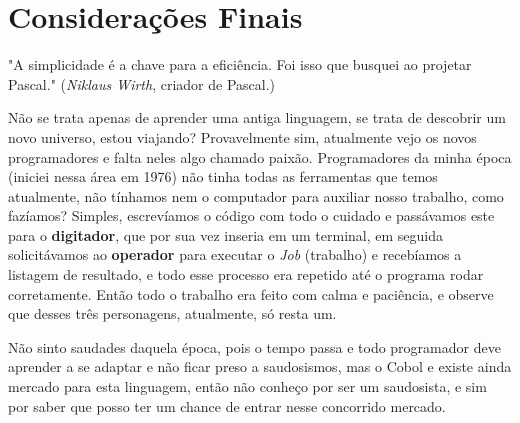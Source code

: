 \documentclass[a4paper,11pt]{book} %
\begin{document}
\pagestyle{empty} %
\tableofcontents %
\cleardoublepage %
\pagestyle{fancy} %
\clearpage %





%
%

\appendix
{}
\chapter{Considerações Finais}
\begin{remark}
"A simplicidade é a chave para a eficiência. Foi isso que busquei ao projetar Pascal." (\textit{Niklaus Wirth}, criador de Pascal.)
\end{remark}

Não se trata apenas de aprender uma antiga linguagem, se trata de descobrir um novo universo, estou viajando? Provavelmente sim, atualmente vejo os novos programadores e falta neles algo chamado paixão. Programadores da minha época (iniciei nessa área em 1976) não tinha todas as ferramentas que temos atualmente, não tínhamos nem o computador para auxiliar nosso trabalho, como fazíamos? Simples, escrevíamos o código com todo o cuidado e passávamos este para o \textbf{digitador}, que por sua vez inseria em um terminal, em seguida solicitávamos ao \textbf{operador} para executar o \textit{Job} (trabalho) e recebíamos a listagem de resultado, e todo esse processo era repetido até o programa rodar corretamente. Então todo o trabalho era feito com calma e paciência, e observe que desses três personagens, atualmente, só resta um.

Não sinto saudades daquela época, pois o tempo passa e todo programador deve aprender a se adaptar e não ficar preso a saudosismos, mas o Cobol e existe ainda mercado para esta linguagem, então não conheço por ser um saudosista, e sim por saber que posso ter um chance de entrar nesse concorrido mercado.
\end{document}
